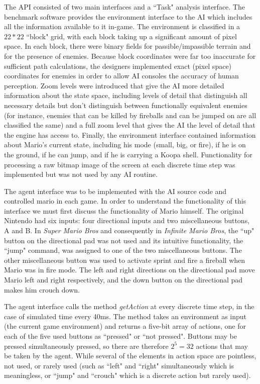 \documentclass[12pt]{article}
\begin{document}
\begin{multicols}{2}
The API consisted of two main interfaces and a ``Task" analysis interface. The benchmark software provides the environment interface 
to the AI which includes all the information available to it in-game. The environment is classified in a $22 * 22$ ``block" grid, with each block 
taking up a significant amount of pixel space. In each block, there were binary fields for passible/impassible terrain and for the presence of enemies. 
Because block coordinates were far too inaccurate for sufficient path calculations, the designers implemented exact (pixel space) coordinates for 
enemies in order to allow AI consoles the accuracy of human perception. Zoom levels were introduced that give the AI more detailed information about the 
state space, including levels of detail that distinguish all necessary details but don't distinguish between functionally equivalent enemies (for instance, enemies that 
can be killed by fireballs and can be jumped on are all classified the same) and a full zoom level that gives the AI the level of detail that the engine has access to.
Finally, the environment interface contained information about Mario's current state, including his mode (small, big, or fire), if he is on the ground, if he can jump, 
and if he is carrying a Koopa shell. Functionality for processing a raw bitmap image of the screen at each discrete time step was implemented but was not used by any AI routine.

The agent interface was to be implemented with the AI source code and controlled mario in each game. In order to understand the functionality of this interface we 
must first discuss the functionality of Mario himself. The original Nintendo had six inputs: four directional inputs and two miscellaneous buttons, A and B. 
In \textit{Super Mario Bros} and consequently in \textit{Infinite Mario Bros}, the ``up" button on the directional pad was not used and its intuitive functionality, 
the ``jump" command, was assigned to one of the two miscellaneous buttons. The other miscellaneous button was used to activate sprint and fire a fireball 
when Mario was in fire mode. The left and right directions on the directional pad move Mario left and right respectively, and the down button on the directional 
pad makes him crouch down. 

The agent interface calls the method \textit{getAction} at every discrete time step, in the case of simulated time every 40ms. 
The method takes an environment as input (the current game environment) and returns a  five-bit array of actions, one for each of the 
five used buttons as ``pressed" or ``not pressed". Buttons may be pressed simultaneously pressed, so there are therefore \(2^5 = 32\) 
actions that may be taken by the agent. While several of the elements in action space are pointless, not used, or rarely used (such as 
``left" and ``right" simultaneously which is meaningless, or ``jump" and ``crouch" which is a discrete action but rarely used). 


\end{multicols}
\end{document}
